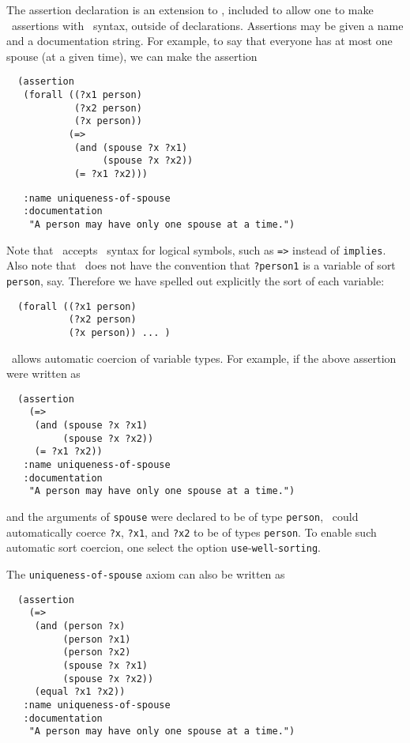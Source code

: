 The assertion declaration is an extension to \kif\/, included to allow one to
make \snark\  assertions with \kif\  syntax, outside of declarations.
Assertions may be given a name and a documentation string.  For example, to
say that everyone has at most one spouse (at a given time), we can make the
assertion
\begin{samepage}
\begin{verbatim}
  (assertion
   (forall ((?x1 person)
            (?x2 person)
            (?x person))
           (=>
            (and (spouse ?x ?x1)
                 (spouse ?x ?x2))
            (= ?x1 ?x2)))
\end{verbatim}
\end{samepage}
\begin{verbatim}
   :name uniqueness-of-spouse
   :documentation
    "A person may have only one spouse at a time.")
\end{verbatim}
 Note that \snark\  accepts \kif\  syntax for logical symbols, such as
 \verb'=>' instead of
 \verb'implies'.  Also note that \kif\  does not have the convention
 that \verb'?person1' is a variable of sort \verb'person', say.
 Therefore we have spelled out explicitly the sort of each variable:
\begin{verbatim}
  (forall ((?x1 person)
           (?x2 person)
           (?x person)) ... )
\end{verbatim}

\Snark\   allows automatic coercion of variable types.  For example,
if the above assertion were written as
\begin{verbatim}
  (assertion
    (=>
     (and (spouse ?x ?x1)
          (spouse ?x ?x2))
     (= ?x1 ?x2))
   :name uniqueness-of-spouse
   :documentation
    "A person may have only one spouse at a time.")
\end{verbatim}
and the arguments of \verb`spouse` were declared to be of type
\verb`person`,
 \snark\ could automatically coerce {\tt ?x}, {\tt ?x1}, and {\tt ?x2} to be
of types \verb`person`.  To enable such automatic sort coercion, one select
the option {\tt use}-{\tt well}-{\tt sorting}.

The {\tt uniqueness-of-spouse} axiom can also be written as
\begin{verbatim}
  (assertion
    (=>
     (and (person ?x)
          (person ?x1)
          (person ?x2)
          (spouse ?x ?x1)
          (spouse ?x ?x2))
     (equal ?x1 ?x2))
   :name uniqueness-of-spouse
   :documentation
    "A person may have only one spouse at a time.")
\end{verbatim}

